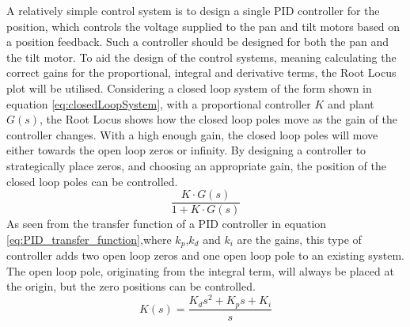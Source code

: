 \documentclass[../../main.tex]{subfiles}
\begin{document}
A relatively simple control system is to design a single PID controller for the position, which controls the voltage supplied to the pan and tilt motors based on a position feedback. Such a controller should be designed for both the pan and the tilt motor. To aid the design of the control systems, meaning calculating the correct gains for the proportional, integral and derivative terms, the Root Locus plot will be utilised. Considering a closed loop system of the form shown in equation \ref{eq:closedLoopSystem}, with a proportional controller $K$ and plant $G(s)$, the Root Locus shows how the closed loop poles move as the gain of the controller changes. With a high enough gain, the closed loop poles will move either towards the open loop zeros or infinity. By designing a controller to strategically place zeros, and choosing an appropriate gain, the position of the closed loop poles can be controlled.
\begin{equation}\label{eq:closedLoopSystem}
    \frac{K\cdot G(s)}{1+K\cdot G(s)}
\end{equation}
As seen from the transfer function of a PID controller in equation \ref{eq:PID_transfer_function},where $k_p$,$k_d$ and $k_i$ are the gains, this type of controller adds two open loop zeros and one open loop pole to an existing system. The open loop pole, originating from the integral term, will always be placed at the origin, but the zero positions can be controlled.
\begin{equation}\label{eq:PID_transfer_function}
    K(s) = \frac{K_d s^2 + K_p s + K_i}{s}
\end{equation}
\end{document}
